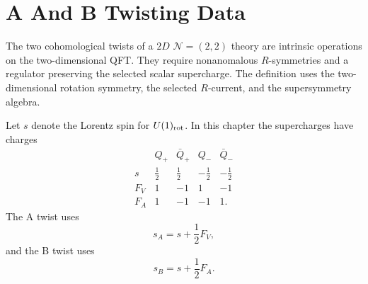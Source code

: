 \section{A And B Twisting Data}

The two cohomological twists of a \(2D\) \(\mathcal N=(2,2)\) theory are
intrinsic operations on the two-dimensional QFT.  They require nonanomalous
\(R\)-symmetries and a regulator preserving the selected scalar supercharge.
The definition uses the two-dimensional rotation symmetry, the selected
\(R\)-current, and the supersymmetry algebra.

\begin{definition}
\label{def:two-dimensional-ab-twist-convention}
Let \(s\) denote the Lorentz spin for \(U(1)_{\rm rot}\).  In this chapter
the supercharges have charges
\begin{equation}
\begin{array}{c|rrrr}
  & Q_+ & \bar Q_+ & Q_- & \bar Q_-\\ \hline
  s & \frac12 & \frac12 & -\frac12 & -\frac12\\
  F_V & 1 & -1 & 1 & -1\\
  F_A & 1 & -1 & -1 & 1 .
\end{array}
\label{eq:two-dimensional-supercharge-charge-table}
\end{equation}
The A twist uses
\begin{equation}
  s_A=s+\frac12F_V ,
  \label{eq:a-twist-spin-shift}
\end{equation}
and the B twist uses
\begin{equation}
  s_B=s+\frac12F_A .
  \label{eq:b-twist-spin-shift}
\end{equation}
\end{definition}

